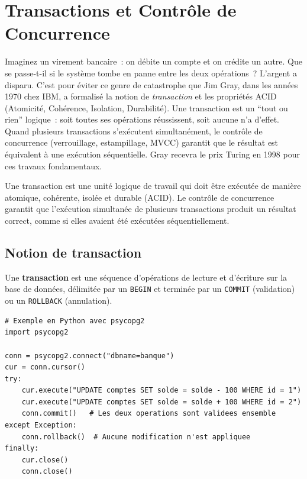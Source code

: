 \chapter{Transactions et Contr\^ole de Concurrence}
\label{ch:transactions}

Imaginez un virement bancaire~: on d\'ebite un compte et on cr\'edite un autre. Que se passe-t-il si le syst\`eme tombe en panne entre les deux op\'erations~? L'argent a disparu. C'est pour \'eviter ce genre de catastrophe que Jim Gray, dans les ann\'ees 1970 chez IBM, a formalis\'e la notion de \emph{transaction} et les propri\'et\'es ACID (Atomicit\'e, Coh\'erence, Isolation, Durabilit\'e). Une transaction est un ``tout ou rien'' logique~: soit toutes ses op\'erations r\'eussissent, soit aucune n'a d'effet. Quand plusieurs transactions s'ex\'ecutent simultan\'ement, le contr\^ole de concurrence (verrouillage, estampillage, MVCC) garantit que le r\'esultat est \'equivalent \`a une ex\'ecution s\'equentielle. Gray recevra le prix Turing en 1998 pour ces travaux fondamentaux.

\begin{intuition}[title=\textbf{Id\'ee centrale}]
Une transaction est une unit\'e logique de travail qui doit \^etre ex\'ecut\'ee
de mani\`ere atomique, coh\'erente, isol\'ee et durable (ACID). Le contr\^ole
de concurrence garantit que l'ex\'ecution simultan\'ee de plusieurs
transactions produit un r\'esultat correct, comme si elles avaient \'et\'e
ex\'ecut\'ees s\'equentiellement.
\end{intuition}

\section{Notion de transaction}

\begin{definition}[Transaction]
Une \textbf{transaction} est une s\'equence d'op\'erations de lecture et
d'\'ecriture sur la base de donn\'ees, d\'elimit\'ee par un \texttt{BEGIN}
et termin\'ee par un \texttt{COMMIT} (validation) ou un \texttt{ROLLBACK}
(annulation).
\end{definition}

\begin{verbatim}
# Exemple en Python avec psycopg2
import psycopg2

conn = psycopg2.connect("dbname=banque")
cur = conn.cursor()
try:
    cur.execute("UPDATE comptes SET solde = solde - 100 WHERE id = 1")
    cur.execute("UPDATE comptes SET solde = solde + 100 WHERE id = 2")
    conn.commit()   # Les deux operations sont validees ensemble
except Exception:
    conn.rollback()  # Aucune modification n'est appliquee
finally:
    cur.close()
    conn.close()
\end{verbatim}

